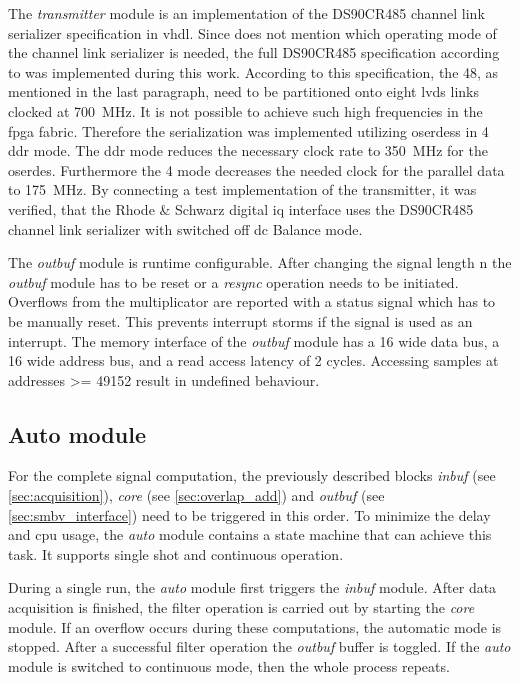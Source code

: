\documentclass[12pt,a4paper,parskip=full,abstract=true,BCOR=12mm,twoside,open=right]{scrreprt}
\def\device#1{\textit{#1}}
\begin{document}
The \device{transmitter} module is an implementation of the DS90CR485 channel
link serializer specification in \gls{vhdl}. Since \cite{fsq_b17} does not
mention which operating mode of the channel link serializer is needed, the
full DS90CR485 specification according to \cite{ds90cr485} was implemented during this work.
According to this specification, the \SI{48}{\bit}, as mentioned in the last
paragraph, need to be partitioned onto eight \gls{lvds} links clocked at
\SI{700}{\mega\hertz}. It is not possible to achieve such high frequencies
in the \gls{fpga} fabric. Therefore the serialization was implemented utilizing
\glspl{oserdes} in \SI{4}{\bit} \gls{ddr} mode. The \gls{ddr} mode reduces the
necessary clock rate to \SI{350}{\mega\hertz} for the \gls{oserdes}. Furthermore the
\SI{4}{\bit} mode decreases the needed clock for the parallel data to
\SI{175}{\mega\hertz}. By connecting a test implementation of the transmitter,
it was verified, that the Rhode \& Schwarz digital \gls{iq} interface uses the
DS90CR485 channel link serializer with switched off \gls{dc} Balance mode.

The \device{outbuf} module is runtime configurable. After changing the signal
length \gls{n} the \device{outbuf} module has to be reset or a \device{resync} operation
needs to be initiated. Overflows from the multiplicator are reported with a status
signal which has to be manually reset. This prevents interrupt storms if the signal is
used as an interrupt. The memory interface of the \device{outbuf}
module has a \SI{16}{\bit} wide data bus, a \SI{16}{\bit} wide address bus, and a read access
latency of 2 cycles. Accessing samples at addresses \num{>= 49152} result in undefined behaviour.


\subsection{Auto module}
\label{sec:auto}

For the complete signal computation, the previously described blocks
\device{inbuf} (see \cref{sec:acquisition}), \device{core} (see
\cref{sec:overlap_add}) and \device{outbuf} (see \cref{sec:smbv_interface})
need to be triggered in this order. To minimize the delay and \gls{cpu}
usage, the \device{auto} module contains a state machine that can achieve
this task. It supports single shot and continuous operation.

During a single run, the \device{auto} module first triggers the \device{inbuf}
module. After data acquisition is finished, the filter operation is carried out
by starting the \device{core} module. If an overflow occurs during these
computations, the automatic mode is stopped. After a successful filter
operation the \device{outbuf} buffer is toggled. If the \device{auto} module
is switched to continuous mode, then the whole process repeats.
\end{document}
